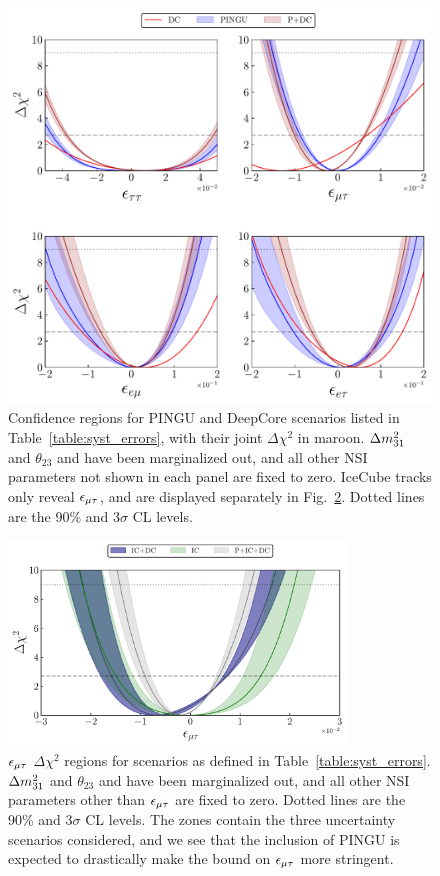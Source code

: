 {\begin{figure}
   \begin{center}
      \includegraphics[scale = 0.7]{figures/joint_3D_NO.pdf}
      \caption{Confidence regions for PINGU and DeepCore scenarios listed in Table~\ref{table:syst_errors}, with their joint $\Delta \chi^2$ in maroon. $\dm[31]$ and $\theta_{23}$ and have been marginalized out, and all other NSI 
      parameters not shown in each panel are fixed to zero. 
      IceCube tracks only reveal $\epsilon_{\mu\tau}$, and are displayed separately in Fig.~\ref{fig:IC_3D}. Dotted lines are the 90\% and $3\sigma$ CL levels.}\label{fig:3D_NO}
   \end{center}
\end{figure} 
\begin{figure}
   \begin{center} 
      \includegraphics[width=0.8\textwidth]{figures/PID_3D_emt.pdf}
      \caption{$\epsilon_{\mu\tau}$ $\Delta \chi^2$ regions for scenarios as defined in Table~\ref{table:syst_errors}.
    $\dm[31]$ and $\theta_{23}$ and have been marginalized out, and all other NSI 
    parameters other than $\epsilon_{\mu\tau}$ are fixed to zero. Dotted lines are the 90\% and $3\sigma$ CL levels.
    The zones contain the three uncertainty scenarios considered, and we see that the inclusion of PINGU is expected 
    to drastically make the bound on $\epsilon_{\mu\tau}$ more stringent.
    }\label{fig:IC_3D}
   \end{center}
\end{figure}

}
